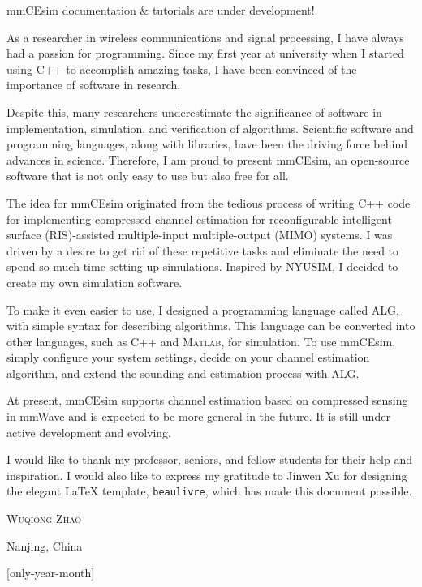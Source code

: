 \begin{tip}
  mmCEsim documentation \& tutorials are under development!
\end{tip}

As a researcher in wireless communications and signal processing,
I have always had a passion for programming.
Since my first year at university
when I started using C++ to accomplish amazing tasks,
I have been convinced of the importance of software in research.

Despite this, many researchers underestimate the significance of software
in implementation, simulation, and verification of algorithms.
Scientific software and programming languages, along with libraries,
have been the driving force behind advances in science.
Therefore, I am proud to present mmCEsim,
an open-source software that is not only easy to use but also free for all.

The idea for mmCEsim originated from the tedious process of writing C++ code
for implementing compressed channel estimation for
reconfigurable intelligent surface (RIS)-assisted multiple-input multiple-output (MIMO) systems.
I was driven by a desire to get rid of these repetitive tasks and eliminate the need
to spend so much time setting up simulations.
Inspired by NYUSIM, I decided to create my own simulation software.

To make it even easier to use, I designed a programming language called ALG,
with simple syntax for describing algorithms.
This language can be converted into other languages, such as C++ and \textsc{Matlab}, for simulation.
To use mmCEsim, simply configure your system settings, decide on your channel estimation algorithm,
and extend the sounding and estimation process with ALG.

At present, mmCEsim supports channel estimation based on compressed sensing in mmWave
and is expected to be more general in the future.
It is still under active development and evolving.

I would like to thank my professor, seniors, and fellow students for their help and inspiration.
I would also like to express my gratitude to Jinwen Xu for designing the elegant \LaTeX{} template,
\texttt{beaulivre}, which has made this document possible.

\begin{flushright}
  \textsc{Wuqiong Zhao}

  Nanjing, China

  \TheDate{\the\year/\the\month}[only-year-month]
\end{flushright}

